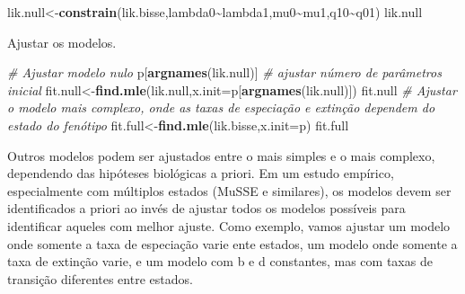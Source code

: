 \documentclass[
]{book}
\newenvironment{Shaded}{\begin{snugshade}}{\end{snugshade}}
\newcommand{\AttributeTok}[1]{\textcolor[rgb]{0.13,0.29,0.53}{#1}}
\newcommand{\CommentTok}[1]{\textcolor[rgb]{0.56,0.35,0.01}{\textit{#1}}}
\newcommand{\FunctionTok}[1]{\textcolor[rgb]{0.13,0.29,0.53}{\textbf{#1}}}
\newcommand{\NormalTok}[1]{#1}
\newcommand{\OtherTok}[1]{\textcolor[rgb]{0.56,0.35,0.01}{#1}}
\newcommand{\SpecialCharTok}[1]{\textcolor[rgb]{0.81,0.36,0.00}{\textbf{#1}}}
\begin{document}
\begin{Shaded}
\begin{Highlighting}[]
\NormalTok{lik.null}\OtherTok{\textless{}{-}}\FunctionTok{constrain}\NormalTok{(lik.bisse,lambda0}\SpecialCharTok{\textasciitilde{}}\NormalTok{lambda1,mu0}\SpecialCharTok{\textasciitilde{}}\NormalTok{mu1,q10}\SpecialCharTok{\textasciitilde{}}\NormalTok{q01)}
\NormalTok{lik.null}
\end{Highlighting}
\end{Shaded}

Ajustar os modelos.

\begin{Shaded}
\begin{Highlighting}[]
\CommentTok{\# Ajustar modelo nulo}
\NormalTok{p[}\FunctionTok{argnames}\NormalTok{(lik.null)] }\CommentTok{\# ajustar número de parâmetros inicial}
\NormalTok{fit.null}\OtherTok{\textless{}{-}}\FunctionTok{find.mle}\NormalTok{(lik.null,}\AttributeTok{x.init=}\NormalTok{p[}\FunctionTok{argnames}\NormalTok{(lik.null)])}
\NormalTok{fit.null}
\CommentTok{\# Ajustar o modelo mais complexo, onde as taxas de especiação e extinção dependem do estado do fenótipo}
\NormalTok{fit.full}\OtherTok{\textless{}{-}}\FunctionTok{find.mle}\NormalTok{(lik.bisse,}\AttributeTok{x.init=}\NormalTok{p)}
\NormalTok{fit.full}
\end{Highlighting}
\end{Shaded}

Outros modelos podem ser ajustados entre o mais simples e o mais complexo, dependendo das hipóteses biológicas a priori. Em um estudo empírico, especialmente com múltiplos estados (MuSSE e similares), os modelos devem ser identificados a priori ao invés de ajustar todos os modelos possíveis para identificar aqueles com melhor ajuste.
Como exemplo, vamos ajustar um modelo onde somente a taxa de especiação varie ente estados, um modelo onde somente a taxa de extinção varie, e um modelo com b e d constantes, mas com taxas de transição diferentes entre estados.
\end{document}
